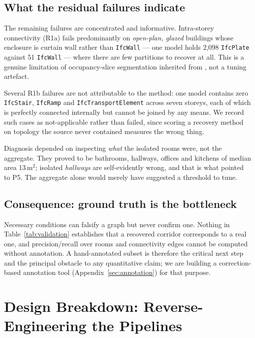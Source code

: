 \documentclass[10pt,twocolumn,letterpaper]{article}
\begin{document}
\subsection{What the residual failures indicate}

The remaining failures are concentrated and informative. Intra-storey
connectivity (R1a) fails predominantly on \emph{open-plan, glazed} buildings
whose enclosure is curtain wall rather than \texttt{IfcWall} --- one model holds
2{,}098 \texttt{IfcPlate} against 51 \texttt{IfcWall} --- where there are few
partitions to recover at all. This is a genuine limitation of occupancy-slice
segmentation inherited from \cite{bormann2016roomseg}, not a tuning artefact.

Several R1b failures are not attributable to the method: one model contains zero
\texttt{IfcStair}, \texttt{IfcRamp} and \texttt{IfcTransportElement} across seven
storeys, each of which is perfectly connected internally but cannot be joined by
any means. We record such cases as not-applicable rather than failed, since
scoring a recovery method on topology the source never contained measures the
wrong thing.

Diagnosis depended on inspecting \emph{what} the isolated rooms were, not the
aggregate. They proved to be bathrooms, hallways, offices and kitchens of median
area 13\,m$^2$; isolated \emph{hallways} are self-evidently wrong, and that is
what pointed to P5. The aggregate alone would merely have suggested a threshold
to tune.

\subsection{Consequence: ground truth is the bottleneck}
\label{sec:bottleneck}

Necessary conditions can falsify a graph but never confirm one. Nothing in
Table~\ref{tab:validation} establishes that a recovered corridor corresponds to
a real one, and precision/recall over rooms and connectivity edges cannot be
computed without annotation. A hand-annotated subset is therefore the critical
next step and the principal obstacle to any quantitative claim; we are building
a correction-based annotation tool (Appendix~\ref{sec:annotation}) for that
purpose.




\clearpage
\onecolumn
\appendix

\section{Design Breakdown: Reverse-Engineering the Pipelines}
\label{sec:appendix}
\end{document}
